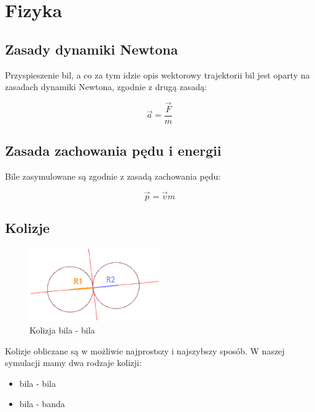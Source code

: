 \section{Fizyka}
\subsection{Zasady dynamiki Newtona}

Przyspieszenie bil, a co za tym idzie opis wektorowy trajektorii bil jest oparty na zasadach 
dynamiki Newtona, zgodnie z drugą zasadą:

\begin{equation}
\vec a = \frac{\vec F}{m}
\end{equation}

\subsection{Zasada zachowania pędu i energii}

Bile zasymulowane są zgodnie z zasadą zachowania pędu:

\begin{equation}
\vec p = \vec v {m}
\end{equation}

\subsection{Kolizje}

\begin{figure}[h]
  \centering
  \includegraphics[width=0.5\textwidth]{./img/bb_col.eps}
  \caption{Kolizja bila - bila}
  \label{fig:bbcol}
\end{figure}

Kolizje obliczane są w możliwie najprostszy i najszybszy sposób. W naszej symulacji mamy dwa rodzaje kolizji:
\begin{itemize}
 \item bila - bila
 \item bila - banda
\end{itemize}

